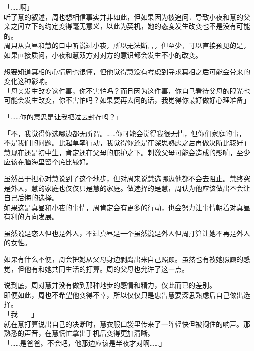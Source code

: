 「……啊」\\

听了慧的叙述，周也想相信事实并非如此，但如果因为被追问，导致小夜和慧的父亲之间立下的约定变得毫无意义，以此为契机，她的态度发生改变也不是没有可能的。\\

周只从真昼和慧的口中听说过小夜，所以无法断言，但至少，可以直接预见的是，如果直接质问，小夜和慧双方对对方的意识都会发生不小的改变。

想要知道真相的心情周也很懂，但他觉得慧没有考虑到寻求真相之后可能会带来的变化这种影响。\\

「母亲发生改变这件事，你不害怕吗？而且因为这件事，你自己看待父母的眼光也可能会发生改变，你不害怕吗？如果要再去问的话，我觉得你最好做好心理准备」

「……你的意思是让我把过去封存吗？」

「不，我觉得你选哪边都无所谓。……你可能会觉得我很无情，但你们家庭的事，不是我们的问题。比起草率行动，我觉得你还是在深思熟虑之后再做决断比较好」\\

慧现在还是初中生，肯定还在父母的庇护之下。刺激父母可能会造成的影响，至少应该在脑海里留个底比较好。

虽然出于担心对慧说到了这个地步，但对周来说慧选哪边他都不会去阻止。慧终究是外人，慧的家庭也仅仅只是慧的家庭。做选择的是慧，周认为他应该做出不会让自己后悔的选择。\\

如果这是真昼和小夜的事情，周肯定会有更多的行动，也会努力让事情朝着对真昼有利的方向发展。

虽然说是恋人但也是外人，不过真昼是一个虽然说是外人但周打算让她不再是外人的女性。

如果有什么不便，周会把她从父母身边剥离出来自己照顾。虽然也有被她照顾的感觉，但他有和她共同生活的打算。周的父母也允许了这一点。

说到底，周对慧并没有做到那种地步的感情和精力，仅此而已的差别。\\

即便如此，周也不希望他变得不幸，所以仅仅只是忠告慧要深思熟虑后自己做出选择。\\

「我——」\\

就在慧打算说出自己的决断时，慧衣服口袋里传来了一阵轻快但被闷住的响声。那熟悉的声音，在慧慌忙拿出手机后变得更加清晰。\\

「……是爸爸。不会吧，他那边应该是半夜才对啊……」\\

